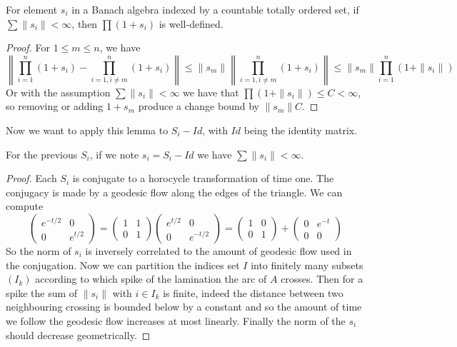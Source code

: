 \begin{lem}
For element $s_i$ in a Banach algebra indexed by a countable totally ordered set, if $\sum \| s_i \| < \infty$, then $\prod(1+s_i)$ is well-defined.
\end{lem}
\begin{proof}
For $1 \leq m \leq n$, we have \[
\left\| \prod_{i=1}^n(1+s_i)-\prod_{i=1,i \neq m}^n (1+s_i) \right\| \leq \|s_m \| \left\| \prod_{i=1,i \neq m}^n (1+s_i) \right\| \leq \|s_m \| \prod_{i=1}^n (1+\|s_i\|)
\]
Or with the assumption $\sum \| s_i \| < \infty$ we have that $\prod(1+\|s_i\|) \leq C < \infty$, so removing or adding $1+s_m$ produce a change bound by $\|s_m\| C$.
\end{proof}

Now we want to apply this lemma to $S_i - Id$, with $Id$ being the identity matrix.

\begin{lem}
For the previous $S_i$, if we note $s_i=S_i - Id$ we have $\sum \| s_i \| < \infty$.
\end{lem}

\begin{proof}
Each $S_i$ is conjugate to a horocycle transformation of time one. The conjugacy is made by a geodesic flow along the edges of the triangle. We can compute \[
\begin{pmatrix} e^{-t/2} & 0 \\ 0 & e^{t/2} \end{pmatrix} = \begin{pmatrix} 1 & 1 \\ 0 & 1 \end{pmatrix} \begin{pmatrix} e^{t/2} & 0 \\ 0 & e^{-t/2} \end{pmatrix} = \begin{pmatrix} 1 & 0 \\ 0 & 1 \end{pmatrix}+ \begin{pmatrix} 0 & e^{-t} \\ 0 & 0 \end{pmatrix}
\]
So the norm of $s_i$ is inversely correlated to the amount of geodesic flow used in the conjugation.
Now we can partition the indices set $I$ into finitely many subsets $(I_k)$ according to which spike of the lamination the arc of $A$ crosses.
Then for a spike the sum of $\|s_i \|$ with $i \in I_k$ is finite, indeed the distance between two neighbouring crossing is bounded below by a constant and so the amount of time we follow the geodesic flow increases at most linearly. Finally the norm of the $s_i$ should decrease geometrically.
\end{proof}

